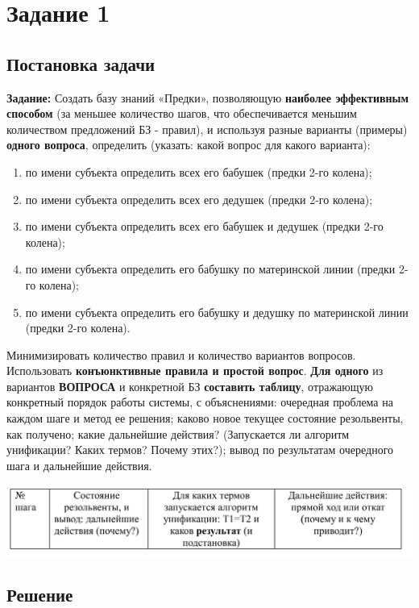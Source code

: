 \section*{Задание 1}
 \subsection*{Постановка задачи}
\textbf{Задание:} Создать базу знаний «Предки», позволяющую \textbf{наиболее эффективным способом}
(за меньшее количество шагов, что обеспечивается меньшим количеством предложений БЗ -
правил), и используя разные варианты (примеры) \textbf{одного вопроса}, определить (указать:
какой вопрос для какого варианта):
\begin{enumerate}
    \item по имени субъекта определить всех его бабушек (предки 2-го колена);
    \item по имени субъекта определить всех его дедушек (предки 2-го колена);
    \item по имени субъекта определить всех его бабушек и дедушек (предки 2-го
	колена);
	\item по имени субъекта определить его бабушку по материнской линии (предки 2-го
	колена);
	\item по имени субъекта определить его бабушку и дедушку по материнской линии
	(предки 2-го колена).
\end{enumerate}

Минимизировать количество правил и количество вариантов вопросов. 
Использовать \textbf{конъюнктивные правила и простой вопрос}.
\textbf{Для одного} из вариантов \textbf{ВОПРОСА} и конкретной БЗ \textbf{составить таблицу},
отражающую конкретный порядок работы системы, с объяснениями:
очередная проблема на каждом шаге и метод ее решения;
каково новое текущее состояние резольвенты, как получено;
какие дальнейшие действия? (Запускается ли алгоритм унификации? Каких термов?
Почему этих?);
вывод по результатам очередного шага и дальнейшие действия.


\includegraphics[scale=0.4]{./inc/img/tb_tmpl}


\clearpage
\subsection*{Решение}
